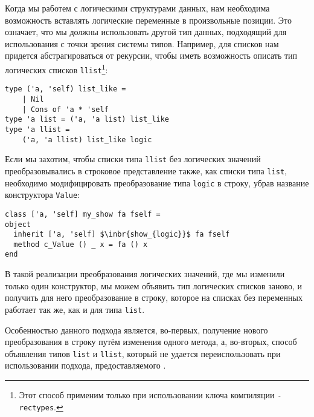 Когда мы работем с логическими структурами данных, нам необходима возможность вставлять логические переменные в произвольные позиции.
Это означает, что мы должны использовать другой тип данных, подходящий для использования 
с точки зрения системы типов. Например,
для списков нам придется абстрагироваться от рекурсии, чтобы иметь возможность описать тип логических списков \lstinline{llist}\footnote{Этот способ применим только при использовании ключа компиляции \texttt{-rectypes}.}:

\begin{lstlisting}
type ('a, 'self) list_like = 
    | Nil 
    | Cons of 'a * 'self
type 'a list = ('a, 'a list) list_like
type 'a llist = 
    ('a, 'a llist) list_like logic
\end{lstlisting}
%

Если мы захотим, чтобы списки типа \lstinline{llist} без логических значений преобразовывались в строковое представление также, как списки типа \lstinline{list}, необходимо модифицировать преобразование типа \lstinline{logic} в строку, убрав название конструктора \lstinline{Value}:

\begin{lstlisting}
class ['a, 'self] my_show fa fself = 
object
  inherit ['a, 'self] $\inbr{show_{logic}}$ fa fself
  method c_Value () _ x = fa () x
end
\end{lstlisting}
В такой реализации преобразования логических значений, где мы изменили только один конструктор, мы можем объявить тип логических списков заново, и получить для него преобразование в строку, которое на списках без переменных работает так же, как и для типа \lstinline{list}.

Особенностью данного подхода является, во-первых, получение нового преобразования в строку путём изменения одного метода, а, во-вторых, способ объявления типов \lstinline{list} и \lstinline{llist}, который не удается переиспользовать при использовании подхода, предоставляемого \visitors{}.

%


